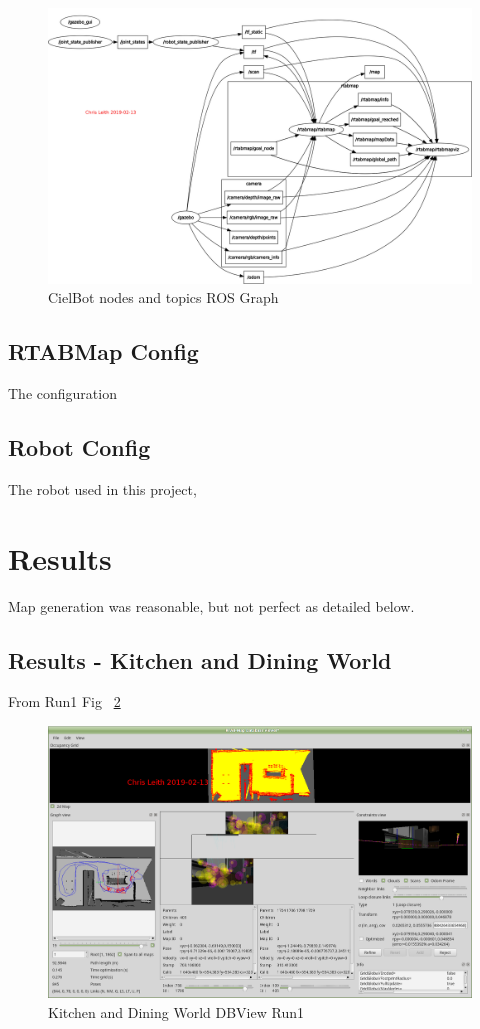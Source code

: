 \documentclass[10pt,journal,compsoc]{IEEEtran}
\begin{document}
\begin{figure}[h]
      \centering
      \includegraphics[width=\linewidth]{Assets/rosgraph_working.png}
      \caption{CielBot nodes and topics ROS Graph}
      \label{fig:rosgraph}
\end{figure}

\subsection{RTABMap Config}
 The configuration 
 
\subsection{Robot Config}
The robot used in this project,

\section{Results}
Map generation was reasonable, but not perfect as detailed below.
\subsection{Results - Kitchen and Dining World}
From Run1 Fig ~\ref{fig:kitchen_dbview_run1} 

\begin{figure}[h]
      \centering
      \includegraphics[width=\linewidth]{Assets/DBViewer_kitchen_2019-02-11_19-04-25.png}
      \caption{Kitchen and Dining World DBView Run1}
      \label{fig:kitchen_dbview_run1}
\end{figure}
\end{document}
